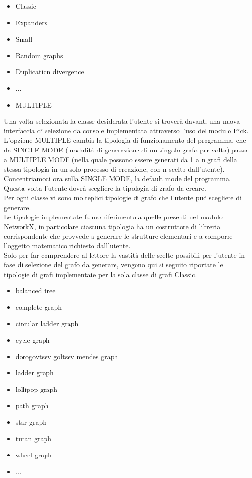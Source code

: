 \begin{itemize}
	\item Classic
	\item Expanders
	\item Small 
	\item Random graphs 
	\item Duplication divergence 
	\item ...
	\item MULTIPLE
\end{itemize}

Una volta selezionata la classe desiderata l'utente si troverà davanti una nuova interfaccia di selezione da console implementata attraverso l'uso del modulo Pick.\\

L'opzione MULTIPLE cambia la tipologia di funzionamento del programma, che da SINGLE MODE (modalità di generazione di un singolo grafo per volta) passa a MULTIPLE MODE (nella quale possono essere generati da 1 a n grafi della stessa tipologia in un solo processo di creazione, con n scelto dall'utente).\\
Concentriamoci ora sulla SINGLE MODE, la default mode del programma.\\

Questa volta l'utente dovrà scegliere la tipologia di grafo da creare.\\
Per ogni classe vi sono molteplici tipologie di grafo che l'utente può scegliere di generare.\\

Le tipologie implementate fanno riferimento a quelle presenti nel modulo NetworkX, in particolare ciascuna tipologia ha un costruttore di libreria corrispondente che provvede a generare le strutture elementari e a comporre l'oggetto matematico richiesto dall'utente.\\

Solo per far comprendere al lettore la vastità delle scelte possibili per l'utente in fase di selezione del grafo da generare, vengono qui si seguito riportate le tipologie di grafi implementate per la sola classe di grafi Classic.

\begin{itemize}
	\item balanced tree
	\item complete graph
	\item circular ladder graph
	\item cycle graph
	\item dorogovtsev goltsev mendes graph
	\item ladder graph
	\item lollipop graph
	\item path graph
	\item star graph
	\item turan graph
	\item wheel graph
	\item ...
\end{itemize}

